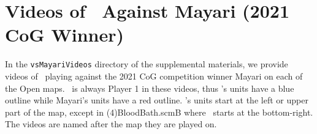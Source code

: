 \documentclass[conference,onecolumn]{IEEEtran}
\newcommand{\mapname}[1]{#1} %
\begin{document}
\section{Videos of \agentName\ Against Mayari (2021 CoG Winner)}
In the \texttt{vsMayariVideos} directory of the supplemental materials, we provide videos of
\agentName\ playing against the 2021 CoG competition winner Mayari on each of the Open
maps. \agentName\ is always Player 1 in these videos, thus \agentName's units have a
blue outline while Mayari's units have a red outline. \agentName's units start at the left or
upper part of the map, except in \mapname{(4)BloodBath.scmB} where \agentName\ starts at the
bottom-right. The videos are named after the map they are played on.



\end{document}
